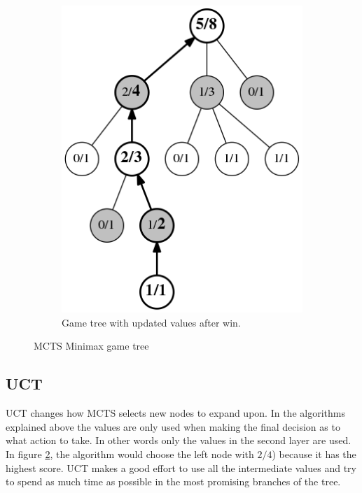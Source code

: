 \documentclass[10pt,letterpaper]{article}
\begin{document}
\begin{figure}
\begin{subfigure}{0.23\textwidth}
    \includegraphics[width=\textwidth]{images/gametree-values-updated}
    \caption{Game tree with  updated values after win.}
    \label{fig:mcts-gametree-values-updated}
    \end{subfigure}
    \caption{MCTS Minimax game tree}
\end{figure}

\subsection{UCT}
UCT changes how MCTS selects new nodes to expand upon. In the algorithms explained above the values are only used when making the final decision as to what action to take. In other words only the values in the second layer are used. In figure \ref{fig:mcts-gametree-values-updated}, the algorithm would choose the left node with $2/4$) because it has the highest score. UCT makes a good effort to use all the intermediate values and try to spend as much time as possible in the most promising branches of the tree.
 
\end{document}
